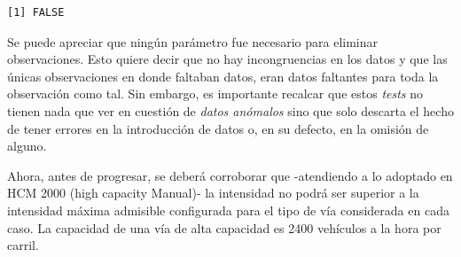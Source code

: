 \documentclass[]{article}
\begin{document}
\begin{verbatim}
[1] FALSE
\end{verbatim}

Se puede apreciar que ningún parámetro fue necesario para eliminar
observaciones. Esto quiere decir que no hay incongruencias en los datos
y que las únicas observaciones en donde faltaban datos, eran datos
faltantes para toda la observación como tal. Sin embargo, es importante
recalcar que estos \emph{tests} no tienen nada que ver en cuestión de
\emph{datos anómalos} sino que solo descarta el hecho de tener errores
en la introducción de datos o, en su defecto, en la omisión de alguno.

Ahora, antes de progresar, se deberá corroborar que -atendiendo a lo
adoptado en HCM 2000 (high capacity Manual)- la intensidad no podrá ser
superior a la intensidad máxima admisible configurada para el tipo de
vía considerada en cada caso. La capacidad de una vía de alta capacidad
es 2400 vehículos a la hora por carril.
\end{document}
